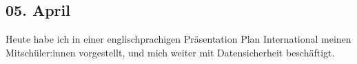 \subsection{05. April}
Heute habe ich in einer englischprachigen Präsentation Plan International meinen Mitschüler:innen vorgestellt, und mich weiter mit Datensicherheit beschäftigt.